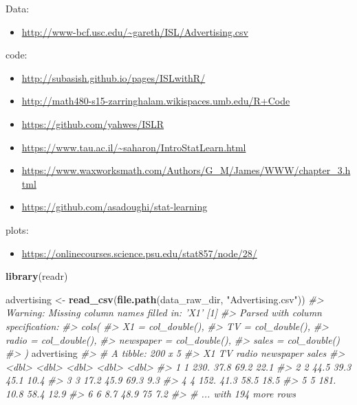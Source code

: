 \documentclass[]{book}
\newenvironment{Shaded}{\begin{snugshade}}{\end{snugshade}}
\newcommand{\CommentTok}[1]{\textcolor[rgb]{0.56,0.35,0.01}{\textit{#1}}}
\newcommand{\KeywordTok}[1]{\textcolor[rgb]{0.13,0.29,0.53}{\textbf{#1}}}
\newcommand{\NormalTok}[1]{#1}
\newcommand{\StringTok}[1]{\textcolor[rgb]{0.31,0.60,0.02}{#1}}
\providecommand{\tightlist}{%
  \setlength{\itemsep}{0pt}\setlength{\parskip}{0pt}}
\begin{document}
Data:

\begin{itemize}
\tightlist
\item
  \url{http://www-bcf.usc.edu/~gareth/ISL/Advertising.csv}
\end{itemize}

code:

\begin{itemize}
\tightlist
\item
  \url{http://subasish.github.io/pages/ISLwithR/}
\item
  \url{http://math480-s15-zarringhalam.wikispaces.umb.edu/R+Code}
\item
  \url{https://github.com/yahwes/ISLR}
\item
  \url{https://www.tau.ac.il/~saharon/IntroStatLearn.html}
\item
  \url{https://www.waxworksmath.com/Authors/G_M/James/WWW/chapter_3.html}
\item
  \url{https://github.com/asadoughi/stat-learning}
\end{itemize}

plots:

\begin{itemize}
\tightlist
\item
  \url{https://onlinecourses.science.psu.edu/stat857/node/28/}
\end{itemize}

\begin{Shaded}
\begin{Highlighting}[]
\KeywordTok{library}\NormalTok{(readr)}

\NormalTok{advertising <-}\StringTok{ }\KeywordTok{read_csv}\NormalTok{(}\KeywordTok{file.path}\NormalTok{(data_raw_dir, }\StringTok{"Advertising.csv"}\NormalTok{))}
\CommentTok{#> Warning: Missing column names filled in: 'X1' [1]}
\CommentTok{#> Parsed with column specification:}
\CommentTok{#> cols(}
\CommentTok{#>   X1 = col_double(),}
\CommentTok{#>   TV = col_double(),}
\CommentTok{#>   radio = col_double(),}
\CommentTok{#>   newspaper = col_double(),}
\CommentTok{#>   sales = col_double()}
\CommentTok{#> )}
\NormalTok{advertising}
\CommentTok{#> # A tibble: 200 x 5}
\CommentTok{#>      X1    TV radio newspaper sales}
\CommentTok{#>   <dbl> <dbl> <dbl>     <dbl> <dbl>}
\CommentTok{#> 1     1 230.   37.8      69.2  22.1}
\CommentTok{#> 2     2  44.5  39.3      45.1  10.4}
\CommentTok{#> 3     3  17.2  45.9      69.3   9.3}
\CommentTok{#> 4     4 152.   41.3      58.5  18.5}
\CommentTok{#> 5     5 181.   10.8      58.4  12.9}
\CommentTok{#> 6     6   8.7  48.9      75     7.2}
\CommentTok{#> # ... with 194 more rows}
\end{Highlighting}
\end{Shaded}
\end{document}
